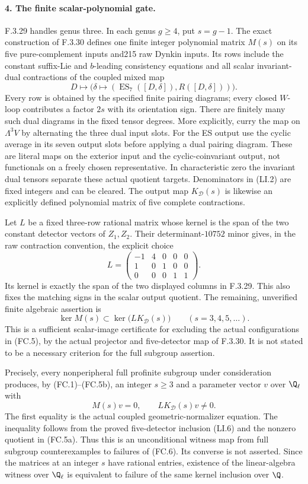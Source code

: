 \paragraph{4. The finite scalar-polynomial gate.}
F.3.29 handles genus three. In each genus
$g\geq4$, put $s=g-1$. The exact construction
of F.3.30 defines one finite integer
polynomial matrix $M(s)$ on its five
pure-complement inputs and215 raw Dynkin
inputs. Its rows include the constant
suffix-Lie and $b$-leading consistency
equations and all scalar invariant-dual
contractions of the coupled mixed map
\[
 D\longmapsto\bigl(\delta\mapsto
    (\operatorname{ES}_7([D,\delta]),R([D,\delta]))\bigr).
\]
Every row is obtained by the specified
finite pairing diagrams; every closed
$W$-loop contributes a factor $2s$ with
its orientation sign. There are finitely
many such dual diagrams in the fixed
tensor degrees. More explicitly, curry the
map on $\Lambda^3V$ by alternating the three
dual input slots. For the ES output use
the cyclic average in its seven output
slots before applying a dual pairing
diagram. These are literal maps on the
exterior input and the cyclic-coinvariant
output, not functionals on a freely
chosen representative. In characteristic
zero the invariant dual tensors separate
these actual quotient targets. Denominators in (LI.2)
are fixed integers and can be cleared.
The output map $K_{\mathcal D}(s)$ is
likewise an explicitly defined polynomial
matrix of five complete contractions.

Let $L$ be a fixed three-row rational matrix
whose kernel is the span of the two
constant detector vectors of $Z_1,Z_2$.
Their determinant-$10752$ minor gives, in the raw
contraction convention, the explicit choice
\[
 L=\begin{pmatrix}-1&4&0&0&0\\1&0&1&0&0\\0&0&0&1&1\end{pmatrix}.
\]
Its kernel is exactly the span of the two displayed
columns in F.3.29. This also fixes the matching signs
in the scalar output quotient.
The remaining, unverified finite algebraic
assertion is
\[
 \ker M(s)\subset\ker\bigl(LK_{\mathcal D}(s)\bigr)
                    \qquad(s=3,4,5,\ldots).                \tag{FC.6}
\]
This is a sufficient scalar-image
certificate for excluding the actual
configurations in (FC.5), by the actual
projector and five-detector map of F.3.30.
It is not stated to be a necessary
criterion for the full subgroup assertion.

Precisely, every nonperipheral full
profinite subgroup under consideration
produces, by (FC.1)--(FC.5b), an integer
$s\geq3$ and a parameter vector $v$ over
$\Q_\ell$ with
\[
               M(s)v=0,\qquad LK_{\mathcal D}(s)v\ne0.
                                                               \tag{FC.7}
\]
The first equality is the actual coupled
geometric-normalizer equation. The
inequality follows from the proved
five-detector inclusion (LI.6) and the
nonzero quotient in (FC.5a). Thus this
is an unconditional witness map from
full subgroup counterexamples to failures
of (FC.6). Its converse is not asserted.
Since the matrices at an integer $s$
have rational entries, existence of the
linear-algebra witness over $\Q_\ell$
is equivalent to failure of the same
kernel inclusion over $\Q$.

